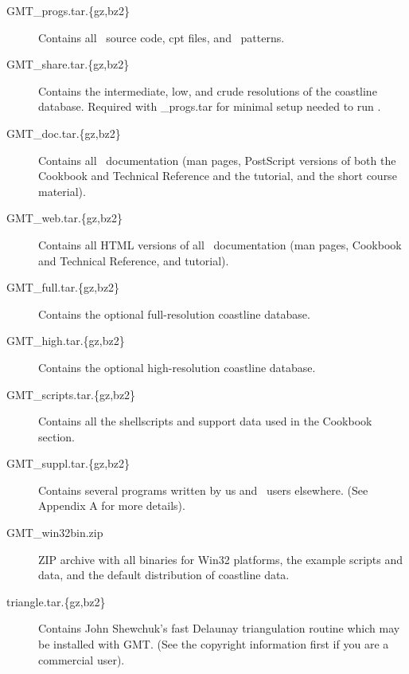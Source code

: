 \begin{description}

\item[GMT\_progs.tar.\{gz,bz2\}] Contains all \GMT\ source code,
cpt files, and \PS\ patterns.

\item [GMT\_share.tar.\{gz,bz2\}] Contains the intermediate,
low, and crude resolutions of the coastline database.  Required
with \_progs.tar for minimal setup needed to run \GMT.

\item[GMT\_doc.tar.\{gz,bz2\}] Contains all \GMT\ documentation
(man pages, PostScript versions of both the Cookbook and Technical
Reference and the tutorial, and the short course material).

\item[GMT\_web.tar.\{gz,bz2\}] Contains all HTML versions of all
\GMT\ documentation (man pages, Cookbook and Technical Reference,
and tutorial).

\item[GMT\_full.tar.\{gz,bz2\}] Contains the optional
full-resolution coastline database.

\item[GMT\_high.tar.\{gz,bz2\}] Contains the optional
high-resolution coastline database.

\item[GMT\_scripts.tar.\{gz,bz2\}] Contains all the shellscripts
and support data used in the Cookbook section.

\item[GMT\_suppl.tar.\{gz,bz2\}] Contains several programs
written by us and \GMT\ users elsewhere. (See Appendix A for more
details).

\item[GMT\_win32bin.zip] ZIP archive with all binaries for Win32
platforms, the example scripts and data, and the default distribution
of coastline data.

\item[triangle.tar.\{gz,bz2\}] Contains John Shewchuk's fast Delaunay
triangulation routine which may be installed with GMT. (See the copyright
information first if you are a commercial user).


\end{description}


